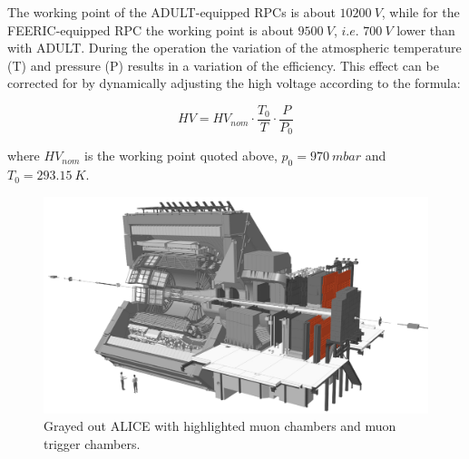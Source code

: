 The working point of the ADULT-equipped RPCs is about $10200\ V$, while for the FEERIC-equipped RPC the working point is about $9500\ V$, $i.e.$ $700\ V$ lower than with ADULT.
During the operation the variation of the atmospheric temperature (T) and pressure (P) results in a variation of the efficiency.
This effect can be corrected for by dynamically adjusting the high voltage according to the formula:

\begin{equation}
\label{eq:HVcorrection}
HV = HV_{nom}\cdot \frac{T_0}{T} \cdot \frac{P}{P_0}
\end{equation}

where $HV_{nom}$ is the working point quoted above, $p_0 = 970\ mbar$ and $T_0 = 293.15\ K$.

\begin{figure}[!t]
\begin{center}
\includegraphics[width=\linewidth]{Chapters/Performance/Figs/ALICEmuon_MTR.pdf}
\caption{Grayed out ALICE with highlighted muon chambers and muon trigger chambers.}
\label{fig:ALICEmuon}
\end{center}
\end{figure}

